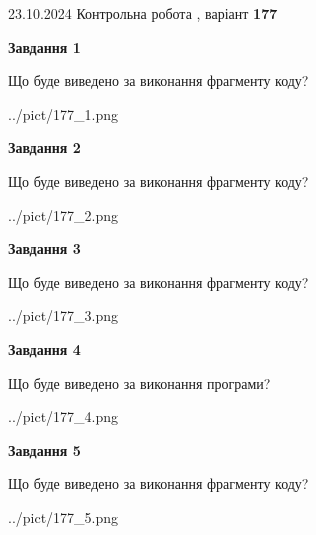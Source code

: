 \documentclass[12pt, ukrainian]{article}
\begin{document}
{\Large{23.10.2024 Контрольна робота , варіант  \No \textbf { 177 }\par}}
{
\begin {large}
{\begin {center}\textbf{Завдання 1}\end {center}}

Що буде виведено за виконання фрагменту коду?\par
\begin{center}
	{../pict/177_1.png}
\end{center}
\newpage

{\begin {center}\textbf{Завдання 2}\end {center}}

Що буде виведено за виконання фрагменту коду?\par
\begin{center}
	{../pict/177_2.png}
\end{center}
\newpage

{\begin {center}\textbf{Завдання 3}\end {center}}

Що буде виведено за виконання фрагменту коду?\par
\begin{center}
	{../pict/177_3.png}
\end{center}
\newpage

{\begin {center}\textbf{Завдання 4}\end {center}}

Що буде виведено за виконання програми?\par
\begin{center}
	{../pict/177_4.png}
\end{center}
\newpage

{\begin {center}\textbf{Завдання 5}\end {center}}

Що буде виведено за виконання фрагменту коду?\par
\begin{center}
	{../pict/177_5.png}
\end{center}
\newpage


\end{large}}
\end{document}
